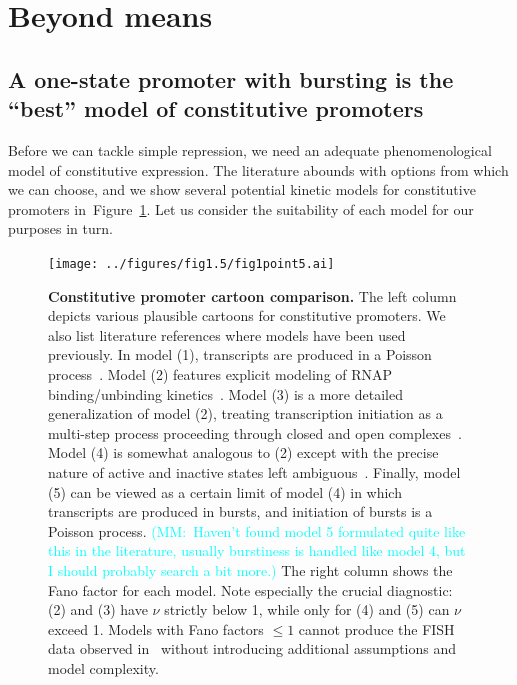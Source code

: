 \documentclass[12pt]{article}%
\newcommand{\mmnote}[1]{\textcolor{cyan}{(MM:~#1)}}
\newcommand{\fig}[1]{Figure~\ref{#1}}
\begin{document}
\section{Beyond means}
\subsection{A one-state promoter with bursting is the ``best'' model of constitutive promoters}
Before we can tackle simple repression, we need an adequate
phenomenological model of constitutive expression.
The literature abounds with options from which we can choose,
and we show several potential kinetic models for constitutive promoters
in~\fig{fig:constit_cartoons}.
Let us consider the suitability of each model for our purposes in turn.

\begin{figure}%
\centering
\texttt{[image: ../figures/fig1.5/fig1point5.ai]}
\caption{\textbf{Constitutive promoter cartoon comparison.}
The left column depicts various plausible cartoons for constitutive promoters.
We also list literature references where models have been used previously.
In model (1), transcripts are produced in a Poisson process~\cite{Jones2014}.
Model (2) features explicit modeling of RNAP binding/unbinding
kinetics~\cite{Phillips2015a}.
Model (3) is a more detailed generalization of model (2),
treating transcription initiation as a multi-step process
proceeding through closed and open complexes~\cite{Mitarai2015}.
Model (4) is somewhat analogous to (2) except with the precise nature
of active and inactive states left ambiguous~\cite{Razo-Mejia2020}.
Finally, model (5) can be viewed as a certain limit of model (4)
in which transcripts are produced in bursts,
and initiation of bursts is a Poisson process.
\mmnote{Haven't found model 5 formulated quite like this in the literature,
usually burstiness is handled like model 4, but I should probably search a bit more.}
The right column shows the Fano factor for each model.
Note especially the crucial diagnostic: (2) and (3) have $\nu$
strictly below 1, while only for (4) and (5) can $\nu$ exceed 1.
Models with Fano factors $\le 1$ cannot produce the FISH data
observed in~\cite{Jones2014} without introducing additional
assumptions and model complexity.
}
\label{fig:constit_cartoons}
\end{figure}
\end{document}
